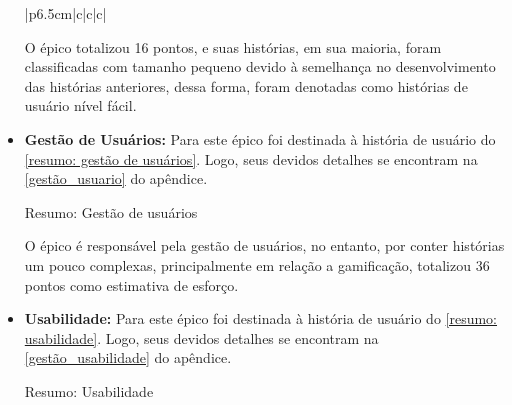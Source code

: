 \begin{itemize}
\begin{quadro}[htb]
{\begin{tabular}{|p{6.5cm}|c|c|c|}
\end{tabular}}
\end{quadro}
\FloatBarrier 

O épico totalizou 16 pontos, e suas histórias, em sua maioria, foram classificadas com tamanho pequeno devido à semelhança no desenvolvimento das histórias anteriores, dessa forma, foram denotadas como histórias de usuário nível fácil.

\item {\textbf{Gestão de Usuários:}} Para este épico foi destinada à história de usuário do \autoref{resumo: gestão de usuários}. Logo, seus devidos detalhes se encontram na \autoref{gestão_usuario} do apêndice.

\def\arraystretch{2}
\begin{quadro}[htb]
\centering
\ABNTEXfontereduzida
\caption{Resumo: Gestão de usuários}
\label{resumo: gestão de usuários}
\end{quadro}
\FloatBarrier 

O épico é responsável pela gestão de usuários, no entanto, por conter histórias um pouco complexas, principalmente em relação a \gls{gamificação}, totalizou 36 pontos como estimativa de esforço. 

\item {\textbf{Usabilidade:}} Para este épico foi destinada à história de usuário do \autoref{resumo: usabilidade}. Logo, seus devidos detalhes se encontram na \autoref{gestão_usabilidade} do apêndice.

\def\arraystretch{2}
\begin{quadro}[htb]
\centering
\ABNTEXfontereduzida
\caption{Resumo: Usabilidade}
\label{resumo: usabilidade}
\end{quadro}
\end{itemize}
